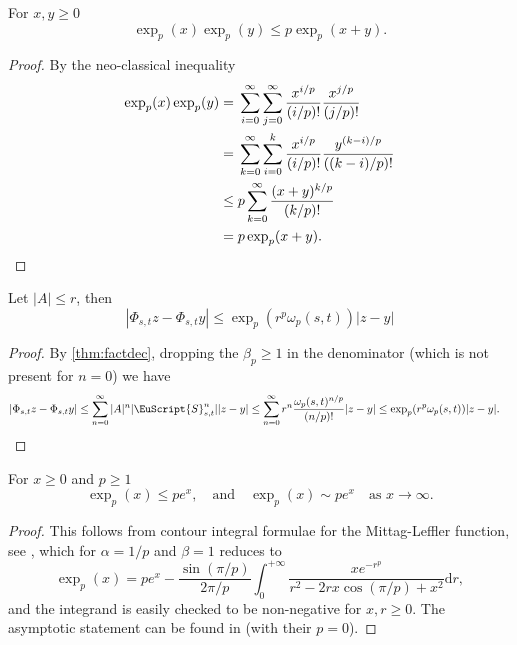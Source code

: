 \documentclass{article}
\def\d{\mathrm{d}}
\def\Sig{\EuScript{S}}
\numberwithin{equation}{section}
\theoremstyle{definition}
\theoremstyle{remark}
\begin{document}
\begin{lemma}
For $x,y \geq 0$
\[
\exp_p(x)\exp_p(y) \leq p\exp_p(x + y) .
\]
\end{lemma}
\begin{proof}
By the neo-classical inequality \cite{HH10}
\begin{align*}
\exp_p(x) \exp_p(y) ={}& \sum_{i = 0}^\infty \sum_{j = 0}^\infty \frac{x^{i/p}}{(i/p)!} \frac{x^{j/p}}{(j/p)!} \\
={}&\sum_{k = 0}^\infty \sum_{i = 0}^k \frac{x^{i/p}}{(i/p)!} \frac{y^{(k-i)/p}}{((k-i)/p)!} \\
\leq{}& p\sum_{k = 0}^\infty \frac{(x+y)^{k/p}}{(k/p)!} \\
={}&p\exp_p(x+y) . \qedhere
\end{align*}
\end{proof}

\begin{lemma}
Let $|A| \leq r$, then
\[
|\Phi_{s,t} z - \Phi_{s,t} y| \leq \exp_p(r^p\omega_p(s,t)) |z-y|
\]
\end{lemma}
\begin{proof}
By \autoref{thm:factdec}, dropping the $\beta_p \geq 1$ in the denominator (which is not present for $n = 0$) we have
\begin{align*}
|\Phi_{s,t} z - \Phi_{s,t} y| &\leq \sum_{n = 0}^\infty |A|^n |\Sig^n_{s,t}| |z-y| \leq \sum_{n = 0}^\infty r^n \frac{\omega_p(s,t)^{n/p}}{(n/p)!} |z-y| \leq \exp_p(r^p\omega_p(s,t)) |z-y| . \qedhere
\end{align*}
\end{proof}

\begin{lemma}\label{lem:MLbound}
For $x \geq 0$ and $p \geq 1$
\[
\exp_p(x) \leq pe^x, \quad \text{and} \quad \exp_p(x) \sim pe^x \quad \text{as } x \to \infty.
\]
\end{lemma}
\begin{proof}
This follows from contour integral formulae for the Mittag-Leffler function, see \cite[(4.7.21) Theorem 4.22]{GKMR20}, which for $\alpha = 1/p$ and $\beta = 1$ reduces to
\[
\exp_p(x) = pe^x - \frac{\sin(\pi/p)}{2\pi/p} \int_0^{+\infty} \frac{x e^{-r^p}}{r^2 - 2rx \cos(\pi/p) + x^2}\d r,
\]
and the integrand is easily checked to be non-negative for $x, r \geq 0$. The asymptotic statement can be found in \cite[Proposition 3.5]{GKMR20} (with their $p = 0$).
\end{proof}
\end{document}
